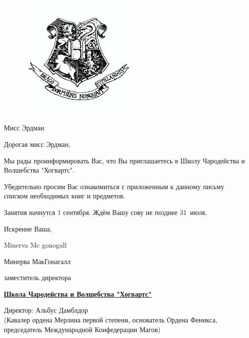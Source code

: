 \documentclass[12pt,a4paper]{book}
\newcommand{\mysize}[1]  
{{\fontsize{14}{1}\selectfont #1 }}
\begin{document}
\begin{titlepage}
\thispagestyle{empty}

\begin{figure}
\begin{center}
\includegraphics[height=6cm]{hogw.png}
\end{center}
\end{figure}
\vspace{1cm}

Мисс Эрдман

\vspace{2.5cm}

\mysize{Дорогая мисс Эрдман, 

Мы рады проинформировать Вас, что Вы приглашаетесь в Школу Чародейства и Волшебства "Хогвартс".

Убедительно просим Вас ознакомиться с приложенным к данному письму списком необходимых книг и предметов. 

Занятия начнутся 1 сентября. Ждём Вашу сову не позднее 31~июля.

Искренне Ваша,

{\fontspec{HeinrichScript} Minerva Mc gonogall }

Минерва МакГонагалл

заместитель директора

}

\vspace{\fill}
\begin{center}
\mysize{\href{https://www.pottermore.com/explore-the-story/hogwarts}{\textbf{Школа Чародейства и Волшебства "Хогвартс"}}}

Директор: Альбус Дамблдор\\
(Кавалер ордена Мерлина первой степени, основатель Ордена Феникса, председатель Международной Конфедерации Магов)
\end{center}

\end{titlepage}
\end{document}
